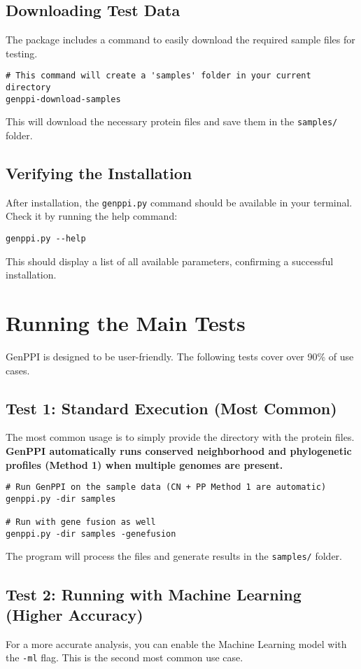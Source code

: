 \documentclass[11pt, a4paper]{article}
\begin{document}
\subsection{Downloading Test Data}
The package includes a command to easily download the required sample files for testing.
\begin{lstlisting}[style=bashstyle]
# This command will create a 'samples' folder in your current directory
genppi-download-samples
\end{lstlisting}
This will download the necessary protein files and save them in the \texttt{samples/} folder.

\subsection{Verifying the Installation}
After installation, the \texttt{genppi.py} command should be available in your terminal. Check it by running the help command:
\begin{lstlisting}[style=bashstyle]
genppi.py --help
\end{lstlisting}
This should display a list of all available parameters, confirming a successful installation.

\section{Running the Main Tests}
GenPPI is designed to be user-friendly. The following tests cover over 90\% of use cases.

\subsection{Test 1: Standard Execution (Most Common)}
The most common usage is to simply provide the directory with the protein files. \textbf{GenPPI automatically runs conserved neighborhood and phylogenetic profiles (Method 1) when multiple genomes are present.}
\begin{lstlisting}[style=bashstyle]
# Run GenPPI on the sample data (CN + PP Method 1 are automatic)
genppi.py -dir samples

# Run with gene fusion as well
genppi.py -dir samples -genefusion
\end{lstlisting}
The program will process the files and generate results in the \texttt{samples/} folder.

\subsection{Test 2: Running with Machine Learning (Higher Accuracy)}
For a more accurate analysis, you can enable the Machine Learning model with the \texttt{-ml} flag. This is the second most common use case.
\end{document}
